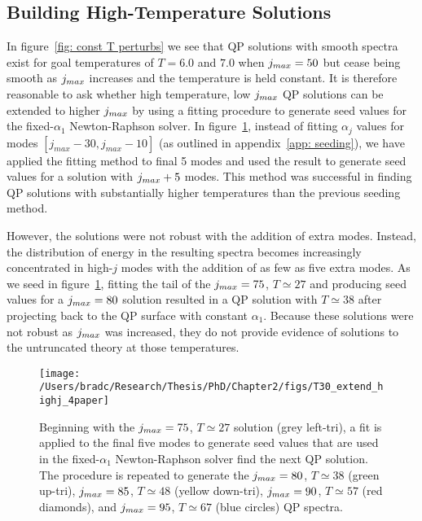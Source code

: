 \documentclass[../PhD.tex]{subfiles}
\begin{document}

\subsection{Building High-Temperature Solutions}
\label{ssec: by hand highT}

In figure~\ref{fig: const T perturbs} we see that QP solutions with smooth spectra exist for goal temperatures of $T=6.0$ and $7.0$ when $j_{max} = 50$ but cease being smooth as $j_{max}$ increases and the temperature is held constant. It is therefore reasonable to ask whether high temperature, low $j_{max}$ QP solutions can be extended to higher $j_{max}$ by using a fitting procedure to generate seed values for the fixed-$\alpha_1$ Newton-Raphson solver. In figure~\ref{fig: manual highT}, instead of fitting $\alpha_j$ values for modes ${[ j_{max} - 30, j_{max} - 10 ]}$ (as outlined in appendix~\ref{app: seeding}), we have applied the fitting method to final 5 modes and used the result to generate seed values for a solution with $j_{max} + 5$ modes. This method was successful in finding QP solutions with substantially higher temperatures than the previous seeding method. 

However, the solutions were not robust with the addition of extra modes. Instead, the distribution of energy in the resulting spectra becomes increasingly concentrated in {high-$j$} modes with the addition of as few as five extra modes. As we seed in figure~\ref{fig: manual highT}, fitting the tail of the $j_{max} = 75$, $T \simeq 27$ and producing seed values for a $j_{max} = 80$ solution resulted in a QP solution with $T \simeq 38$ after projecting back to the QP surface with constant $\alpha_1$. Because these solutions were not robust as $j_{max}$ was increased, they do not provide evidence of solutions to the untruncated theory at those temperatures.

\begin{figure}[ht]
	\centering
	\texttt{[image: /Users/bradc/Research/Thesis/PhD/Chapter2/figs/T30\_extend\_highj\_4paper]}
	\caption[Constructing high temperature solutions by hand]{Beginning with the $j_{max} = 75$, $T \simeq 27$ solution (grey left-tri), a fit is applied to the final five modes to generate seed values that are used in the fixed-$\alpha_1$ Newton-Raphson solver find the next QP solution. The procedure is repeated to generate the $j_{max} = 80$, $T \simeq 38$ (green up-tri), $j_{max} = 85$, $T \simeq 48$ (yellow down-tri), $j_{max} = 90$, $T \simeq 57$ (red diamonds), and $j_{max} = 95$, $T \simeq 67$ (blue circles) QP spectra.}
	\label{fig: manual highT}
\end{figure}
\end{document}
